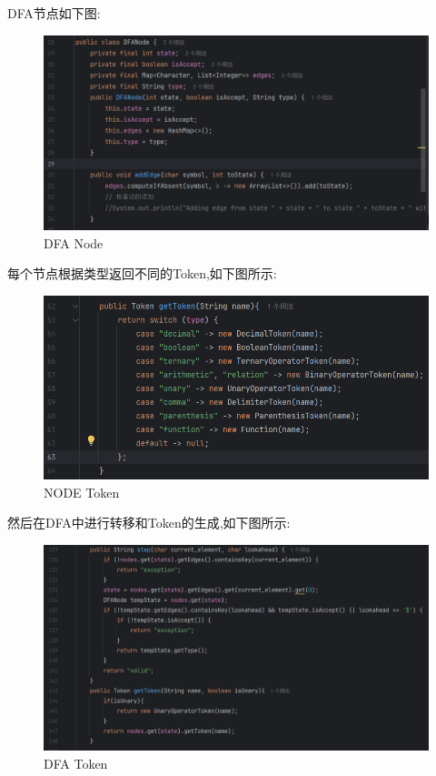 \documentclass{article}
\begin{document}
DFA节点如下图:\begin{figure}[H]
    \centering
    \includegraphics[width=\linewidth]{DFANodes.png}
    \caption{DFA Node}
    \label{fig:DFANodes}
\end{figure}
\newpage
每个节点根据类型返回不同的Token,如下图所示:
\begin{figure}[H]
    \centering
    \includegraphics[width=\linewidth]{image17.png}
    \caption{NODE Token}
    \label{fig:image17}
\end{figure}
然后在DFA中进行转移和Token的生成,如下图所示:
\begin{figure}[H]
    \centering
    \includegraphics[width=\linewidth]{image18.png}
    \caption{DFA Token}
    \label{fig:image18}
\end{figure}
\end{document}
